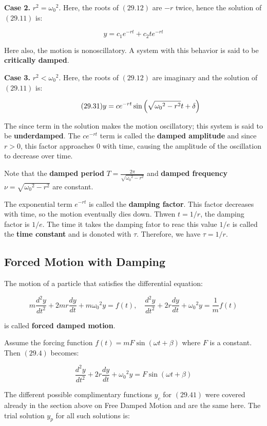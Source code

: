 \documentclass{article}
\begin{document}
\textbf{Case 2.} $r^2 = {\omega_0}^2$. Here, the roots of $(29.12)$ are $-r$ twice, hence the solution of $(29.11)$ is:

\[ \tag{29.2} y = c_1 e^{-rt} + c_2 t e^{-rt} \]

Here also, the motion is nonoscillatory. A system with this behavior is said to be \textbf{critically damped}.

\textbf{Case 3.} $r^2 < {\omega_0}^2$. Here, the roots of $(29.12)$ are imaginary and the solution of $(29.11)$ is:

\[ \tag{29.31} y = ce^{-rt} \sin{\left(\sqrt{ {\omega_0}^2 - r^2}t + \delta\right)} \]

The since term in the solution makes the motion oscillatory; this system is said to be \textbf{underdamped}.  The $ce^{-rt}$ term is called the \textbf{damped amplitude} and since $r > 0$, this factor approaches 0 with time, causing the amplitude of the oscillation to decrease over time.

Note that the \textbf{damped period} $T = \frac{2 \pi}{\sqrt{ {\omega_0}^2 - r^2}}$ and \textbf{damped frequency} $\nu =  \sqrt{ {\omega_0}^2 - r^2}$ are constant.

The exponential term $e^{-rt}$ is called the \textbf{damping factor}. This factor decreases with time, so the motion eventually dies down. Thwen $t = 1/r$, the damping factor is $1/e$. The time it takes the damping fator to reac this value $1/e$ is called the \textbf{time constant} and is donoted with $\tau$. Therefore, we have $\tau = 1/r$.

\subsection{Forced Motion with Damping}

The motion of a particle that satisfies the differential equation:

\[ \tag{29.4} m\frac{d^2y}{dt^2} + 2mr \frac{dy}{dt} + m {\omega_0}^2 y = f(t), \quad \frac{d^2y}{dt^2} + 2r \frac{dy}{dt} + {\omega_0}^2 y = \frac{1}{m}f(t) \]

is called \textbf{forced damped motion}.

Assume the forcing function $f(t) = mF\sin{(\omega t + \beta)}$ where $F$ is a constant. Then $(29.4)$ becomes:

\[ \tag{29.41} \frac{d^2y}{dt^2} + 2r \frac{dy}{dt} + {\omega_0}^2 y = F\sin{(\omega t + \beta)} \]

The different possible complimentary functions $y_c$ for $(29.41)$ were covered already in the section above on Free Damped Motion and are the same here. The trial solution $y_p$ for all such solutions is:
\end{document}
